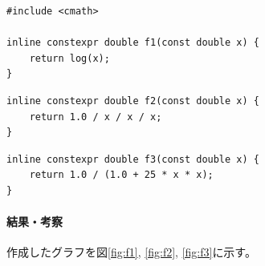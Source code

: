 \documentclass[a4j, titlepage]{jsarticle}
\numberwithin{equation}{section}
\begin{document}
            \begin{lstlisting}[caption=$f_1(x)$の実装, label=src:f1]
#include <cmath>

inline constexpr double f1(const double x) {
    return log(x);
}
            \end{lstlisting}
            \begin{lstlisting}[caption=$f_2(x)$の実装, label=src:f2]
inline constexpr double f2(const double x) {
    return 1.0 / x / x / x;
}
            \end{lstlisting}
            \begin{lstlisting}[caption=$f_3(x)$の実装, label=src:f3]
inline constexpr double f3(const double x) {
    return 1.0 / (1.0 + 25 * x * x);
}
            \end{lstlisting}

            \paragraph{結果・考察}
                作成したグラフを図\ref{fig:f1}, \ref{fig:f2}, \ref{fig:f3}に示す。
                
\end{document}
